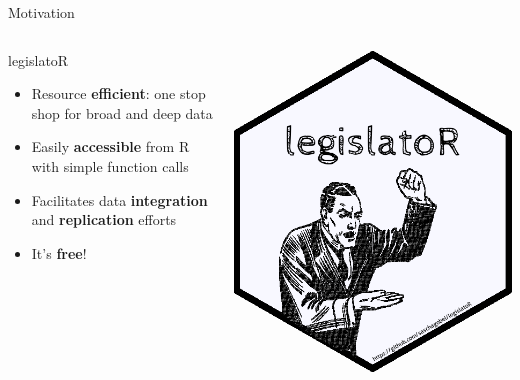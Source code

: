 \begin{frame}{Motivation}
\begin{columns}
  \begin{block}{legislatoR}
\begin{itemize}
	\item Resource \textbf{efficient}: one stop shop for broad and deep data
	\item Easily \textbf{accessible} from R with simple function calls
	\item Facilitates data \textbf{integration} and \textbf{replication} efforts
	\item It's \textbf{free}!
\end{itemize}
\end{block}     
 \vspace{.2cm}
\includegraphics[width=\textwidth]{logo.png}
\end{columns}
\end{frame}

